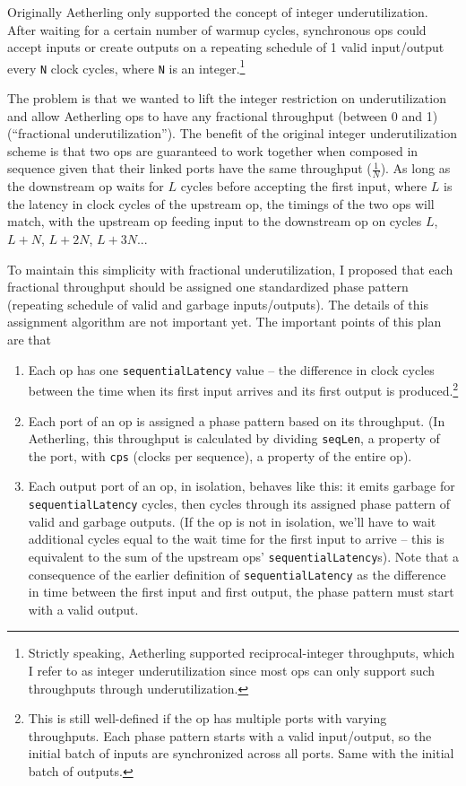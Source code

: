 \documentclass[12pt]{article}
\begin{document}
Originally Aetherling only supported the concept of integer
underutilization. After waiting for a certain number of warmup cycles,
synchronous ops could accept inputs or create outputs on a repeating
schedule of 1 valid input/output every \texttt{N} clock cycles, where
\texttt{N} is an integer.\footnote{Strictly speaking, Aetherling
  supported reciprocal-integer throughputs, which I refer to as
  integer underutilization since most ops can only support such
  throughputs through underutilization.}

The problem is that we wanted to lift the integer restriction on
underutilization and allow Aetherling ops to have any fractional
throughput (between 0 and 1) (``fractional underutilization''). The
benefit of the original integer underutilization scheme is that two
ops are guaranteed to work together when composed in sequence given
that their linked ports have the same throughput ($\frac{1}{N}$). As
long as the downstream op waits for $L$ cycles before accepting the
first input, where $L$ is the latency in clock cycles of the upstream
op, the timings of the two ops will match, with the upstream op
feeding input to the downstream op on cycles $L$, $L+N$, $L+2N$,
$L+3N$...

To maintain this simplicity with fractional underutilization, I
proposed that each fractional throughput should be assigned one
standardized phase pattern (repeating schedule of valid and garbage
inputs/outputs). The details of this assignment algorithm are not
important yet. The important points of this plan are that
\begin{enumerate}
\item Each op has one \texttt{sequentialLatency} value -- the
  difference in clock cycles between the time when its first input
  arrives and its first output is produced.\footnote{This is still
    well-defined if the op has multiple ports with varying
    throughputs. Each phase pattern starts with a valid input/output,
    so the initial batch of inputs are synchronized across all
    ports. Same with the initial batch of outputs. }
\item Each port of an op is assigned a phase pattern based on its
  throughput. (In Aetherling, this throughput is calculated by
  dividing \texttt{seqLen}, a property of the port, with \texttt{cps}
  (clocks per sequence), a property of the entire op).
\item Each output port of an op, in isolation, behaves like this: it
  emits garbage for \texttt{sequentialLatency} cycles, then cycles
  through its assigned phase pattern of valid and garbage outputs. (If
  the op is not in isolation, we'll have to wait additional cycles
  equal to the wait time for the first input to arrive -- this is
  equivalent to the sum of the upstream ops'
  \texttt{sequentialLatency}s). Note that a consequence of the earlier
  definition of \texttt{sequentialLatency} as the difference in time
  between the first input and first output, the phase pattern must
  start with a valid output.
\end{enumerate}
\end{document}
